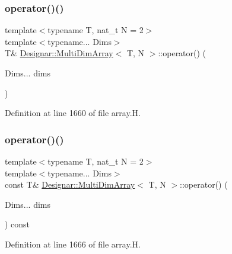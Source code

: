 \subsubsection{\texorpdfstring{operator()()}{operator()()}\hspace{0.1cm}{\footnotesize\ttfamily [1/2]}}
{\footnotesize\ttfamily template$<$typename T, nat\+\_\+t N = 2$>$ \\
template$<$typename... Dims$>$ \\
T\& \hyperlink{class_designar_1_1_multi_dim_array}{Designar\+::\+Multi\+Dim\+Array}$<$ T, N $>$\+::operator() (\begin{DoxyParamCaption}\item[{Dims...}]{dims }\end{DoxyParamCaption})\hspace{0.3cm}{\ttfamily [inline]}}



Definition at line 1660 of file array.\+H.

\mbox{\label{class_designar_1_1_multi_dim_array_a1edce0b31104f2b50bd8f8047e373b78}} 
\subsubsection{\texorpdfstring{operator()()}{operator()()}\hspace{0.1cm}{\footnotesize\ttfamily [2/2]}}
{\footnotesize\ttfamily template$<$typename T, nat\+\_\+t N = 2$>$ \\
template$<$typename... Dims$>$ \\
const T\& \hyperlink{class_designar_1_1_multi_dim_array}{Designar\+::\+Multi\+Dim\+Array}$<$ T, N $>$\+::operator() (\begin{DoxyParamCaption}\item[{Dims...}]{dims }\end{DoxyParamCaption}) const\hspace{0.3cm}{\ttfamily [inline]}}



Definition at line 1666 of file array.\+H.

\mbox{\label{class_designar_1_1_multi_dim_array_a4f191233c720bc670a181682b0452347}} 

